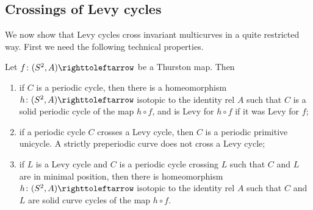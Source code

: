 \documentclass{amsart}
\begin{document}
\subsection{Crossings of Levy cycles}
We now show that Levy cycles cross invariant multicurves in a quite
restricted way. First we need the following technical properties.

\begin{prop}\label{prop:solidPerCycl}
  Let $f\colon(S^2,A)\selfmap$ be a Thurston map. Then
  \begin{enumerate}
  \item if $C$ is a periodic cycle, then there is a homeomorphism
    $h\colon(S^2,A)\selfmap$ isotopic to the identity rel $A$ such
    that $C$ is a solid periodic cycle of the map $h\circ f$, and is
    Levy for $h\circ f$ if it was Levy for
    $f$;\label{prop:solidPerCycl:1}
  \item if a periodic cycle $C$ crosses a Levy cycle, then $C$ is a
    periodic primitive unicycle. A strictly preperiodic curve does not
    cross a Levy cycle;\label{prop:solidPerCycl:2}
  \item if $L$ is a Levy cycle and $C$ is a periodic cycle crossing
    $L$ such that $C$ and $L$ are in minimal position, then there is
    homeomorphism $h\colon(S^2,A)\selfmap$ isotopic to the identity
    rel $A$ such that $C$ and $L$ are solid curve cycles of the map
    $h\circ f$.\label{prop:solidPerCycl:3}
  \end{enumerate}
\end{prop}
\end{document}
